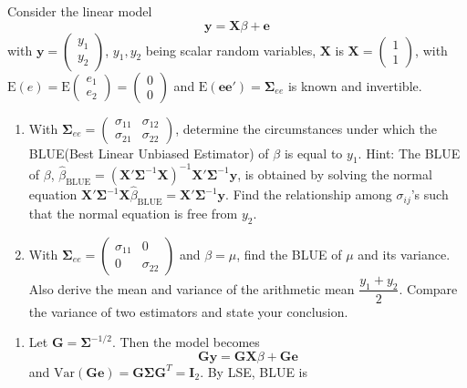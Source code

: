 \documentclass[answers]{exam}
\newcommand{\bs}{\boldsymbol}
\begin{document}
\begin{questions}
\begin{solution}
   \end{solution}
   \question
   Consider the linear model
   $$
    \bs{y}=\bs{X}\beta+\bs{e}
   $$
   with $\bs{y}=\begin{pmatrix}y_{1}\\y_{2}\end{pmatrix}$, $y_{1},y_{2}$ being scalar random variables, $\bs{X}$ is $\bs{X}=\begin{pmatrix}1 \\ 1 \end{pmatrix}$, with $\mathrm{E}\left(e\right)=\mathrm{E}\begin{pmatrix}e_{1}\\e_{2}\end{pmatrix}=\begin{pmatrix}0\\0\end{pmatrix}$ and $\mathrm{E}\left(\bs{ee}'\right)=\bs{\Sigma}_{ee}$ is known and invertible.
   \begin{enumerate}
    \item With $\bs{\Sigma}_{ee}=\begin{pmatrix}\sigma_{11} &\sigma_{12}\\\sigma_{21} & \sigma_{22} \end{pmatrix}$, determine the circumstances under which the BLUE(Best Linear Unbiased Estimator) of $\beta$ is equal to $y_{1}$. Hint: The BLUE of $\beta$, $\hat{\beta}_{\text{BLUE}}=\left(\bs{X}'\bs{\Sigma}^{-1}\bs{X}\right)^{-1}\bs{X}'\bs{\Sigma}^{-1}\bs{y}$, is obtained by solving the normal equation $\bs{X}'\bs{\Sigma}^{-1}\bs{X}\hat{\beta}_{\text{BLUE}}=\bs{X}'\bs{\Sigma}^{-1}\bs{y}$. Find the relationship among $\sigma_{ij}$'s such that the normal equation is free from $y_{2}$.
    \item With $\bs{\Sigma}_{ee}=\begin{pmatrix}\sigma_{11}& 0\\ 0 & \sigma_{22}\end{pmatrix} $ and $\beta=\mu$, find the BLUE of $\mu$ and its variance. Also derive the mean and variance of the arithmetic mean $\dfrac{y_{1}+y_{2}}{2}$. Compare the variance of two estimators and state your conclusion.
   \end{enumerate}
   \begin{solution}
    \begin{enumerate}
      \item Let $\bs{G}=\bs{\Sigma}^{-1/2}$. Then the model becomes
      $$
        \bs{Gy} = \bs{GX}\beta+\bs{Ge}
      $$
      and $\mathrm{Var}\left(\bs{Ge}\right)=\bs{G\Sigma G}^{T}=\bs{I}_{2}$. By LSE, BLUE is

\end{enumerate}
\end{solution}
\end{questions}
\end{document}
